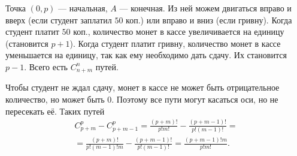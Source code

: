 \documentclass{book}
\begin{document}
Точка $ \left( 0, p \right) $ --- начальная, $A$ --- конечная.
Из ней можем двигаться вправо и вверх (если студент заплатил $50$ коп.) или вправо и вниз (если гривну).
Когда студент платит $50$ коп., количество монет в кассе увеличивается на единицу (становится $p + 1$).
Когда студент платит гривну, количество монет в кассе уменьшается на единицу, так как ему необходимо дать сдачу.
Их становится $p - 1$.
Всего есть $C_{n+m}^n$ путей.

Чтобы студент не ждал сдачу, монет в кассе не может быть отрицательное количество, но может быть 0.
Поэтому все пути могут касаться оси, но не пересекать её.
Таких путей 
\begin{equation*}
\begin{split}
C_{p+m}^p - C_{p+m-1}^p =
\frac{ \left( p+m \right)!}{p!m!} - \frac{ \left( p+m-1 \right)!}{p! \left( m-1 \right)!} = \\
= \frac{ \left( p+m \right)!}{p! \left( m-1 \right)! m} - \frac{ \left( p+m-1 \right)!}{p! \left( m-1 \right)!} =
\frac{ \left( p+m-1 \right)!m}{p!m!}.
\end{split}
\end{equation*}
\end{document}
